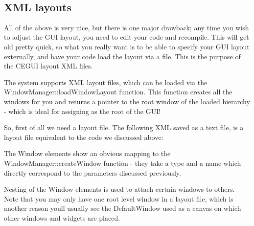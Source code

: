 ~\newline
 \hypertarget{window_tutorial_window_tutorial_creating_xml}{}\subsection{X\+M\+L layouts}\label{window_tutorial_window_tutorial_creating_xml}
All of the above is very nice, but there is one major drawback; any time you wish to adjust the G\+UI layout, you need to edit your code and recompile. This will get old pretty quick, so what you really want is to be able to specify your G\+UI layout externally, and have your code load the layout via a file. This is the purpose of the C\+E\+G\+UI layout X\+ML files.

The system supports X\+ML layout files, which can be loaded via the Window\+Manager\+::load\+Window\+Layout function. This function creates all the windows for you and returns a pointer to the root window of the loaded hierarchy -\/ which is ideal for assigning as the root of the G\+U\+I!

So, first of all we need a layout file. The following X\+ML saved as a text file, is a layout file equivalent to the code we discussed above\+: 
\begin{DoxyCode}{0}
\end{DoxyCode}


The Window elements show an obvious mapping to the Window\+Manager\+::create\+Window function -\/ they take a type and a name which directly correspond to the parameters discussed previously.

Nesting of the Window elements is used to attach certain windows to others. Note that you may only have one \textquotesingle{}root\textquotesingle{} level window in a layout file, which is another reason you\textquotesingle{}ll usually see the Default\+Window used as a canvas on which other windows and widgets are placed.

